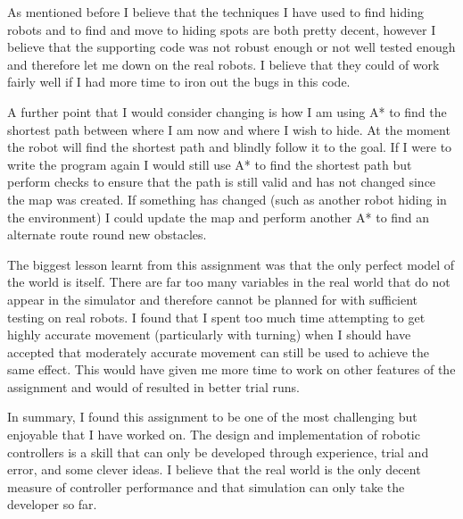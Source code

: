 \documentclass{article}
\begin{document}
As mentioned before I believe that the techniques I have used to find hiding robots and to find and move to hiding spots are both pretty decent, however I believe that the supporting code was not robust enough or not well tested enough and therefore let me down on the real robots. I believe that they could of work fairly well if I had more time to iron out the bugs in this code.

A further point that I would consider changing is how I am using A* to find the shortest path between where I am now and where I wish to hide. At the moment the robot will find the shortest path and blindly follow it to the goal. If I were to write the program again I would still use A* to find the shortest path but perform checks to ensure that the path is still valid and has not changed since the map was created. If something has changed (such as another robot hiding in the environment) I could update the map and perform another A* to find an alternate route round new obstacles.

The biggest lesson learnt from this assignment was that the only perfect model of the world is itself. There are far too many variables in the real world that do not appear in the simulator and therefore cannot be planned for with sufficient testing on real robots. I found that I spent too much time attempting to get highly accurate movement (particularly with turning) when I should have accepted that moderately accurate movement can still be used to achieve the same effect. This would have given me more time to work on other features of the assignment and would of resulted in better trial runs.

In summary, I found this assignment to be one of the most challenging but enjoyable that I have worked on. The design and implementation of robotic controllers is a skill that can only be developed through experience, trial and error, and some clever ideas. I believe that the real world is the only decent measure of controller performance and that simulation can only take the developer so far.
\end{document}
